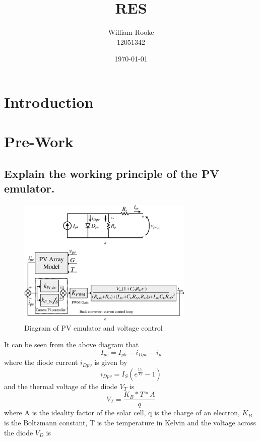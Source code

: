 \documentclass[]{article}
\title{RES}
\author{William Rooke\\12051342}
\date{\today}
\begin{document}
\maketitle

\section{Introduction}

\section{Pre-Work}
    \subsection{Explain the working principle of the PV emulator.}
        \begin{figure}[H]
        	\centering
        	\includegraphics*[width=0.75\textwidth]{PVDiagram}
        	\caption{Diagram of PV emulator and voltage control}
        \end{figure}
        It can be seen from the above diagram that
        \begin{equation}\label{eq:TotalCurrent}
            I_{pv} = I_{ph} - i_{Dpv} - i_p
        \end{equation}
        where the diode current $i_{Dpv}$ is given by
        \begin{equation}\label{eq:DiodeCurrent}
            i_{Dpv} = I_S (e^{\frac{V_D}{V_T}} - 1)
        \end{equation}
        and the thermal voltage of the diode $V_T$ is 
        \begin{equation}\label{eq:ThermalVoltage}
            V_T=\frac{K_B*T*A}{q}
        \end{equation}
        where A is the ideality factor of the solar cell, q is the charge of an electron, $K_B$ is the Boltzmann constant, T is the temperature in Kelvin and the voltage across the diode $V_D$ is
\end{document}
